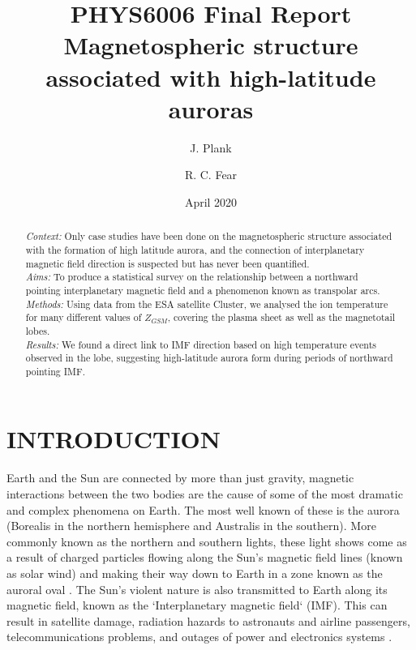 \documentclass[12pt]{article}
\title{PHYS6006 Final Report \\
       Magnetospheric structure associated with high-latitude auroras}
\author[1]{J. Plank}
\author[2]{R. C. Fear}
\affil[1, 2]{Department of Physics and Astronomy, University of Southampton}
\date{April 2020}
\begin{document}
\sloppy
\maketitle

\begin{abstract}
    \noindent\textit{Context:} Only case studies have been done on the magnetospheric structure associated with the formation of high latitude aurora, and the connection of interplanetary magnetic field direction is suspected but has never been quantified.\\
    \textit{Aims:} To produce a statistical survey on the relationship between a northward pointing interplanetary magnetic field and a phenomenon known as transpolar arcs.\\
    \textit{Methods:} Using data from the ESA satellite Cluster, we analysed the ion temperature for many different values of $Z_{GSM}$, covering the plasma sheet as well as the magnetotail lobes.\\
    \textit{Results:} We found a direct link to IMF direction based on high temperature events observed in the lobe, suggesting high-latitude aurora form during periods of northward pointing IMF.
\end{abstract}

\pagebreak

\tableofcontents
{}

\pagebreak


\section{INTRODUCTION}
Earth and the Sun are connected by more than just gravity, magnetic interactions between the two bodies are the cause of some of the most dramatic and complex phenomena on Earth. The most well known of these is the aurora (Borealis in the northern hemisphere and Australis in the southern). More commonly known as the northern and southern lights, these light shows come as a result of charged particles flowing along the Sun's magnetic field lines (known as solar wind) and making their way down to Earth in a zone known as the auroral oval \cite{AAAspaceweather}. The Sun's violent nature is also transmitted to Earth along its magnetic field, known as the `Interplanetary magnetic field` (IMF). This can result in satellite damage, radiation hazards to astronauts and airline passengers, telecommunications problems, and outages of power and electronics systems \cite{AAAspaceweather}.
\end{document}
